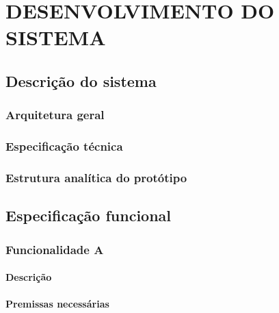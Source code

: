 \chapter{DESENVOLVIMENTO DO SISTEMA}
\label{chap:desenv}


\section{Descrição do sistema}
\label{sec:descsis}

\subsection{Arquitetura geral}
\label{sub:arqg}

\subsection{Especificação técnica}
\label{sub:esptec}

\subsection{Estrutura analítica do protótipo}
\label{sub:eap}



\section{Especificação funcional} %
\label{sec:sota}



\subsection{Funcionalidade A}
\label{sub:funcA}

\subsubsection{Descrição} %
\label{ssub:descA}

\subsubsection{Premissas necessárias}
\label{ssub:premA}

